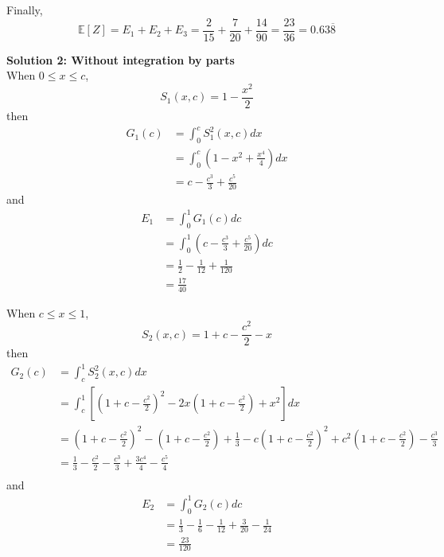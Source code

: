 \documentclass[12pt]{simple_doc}
\begin{document}
    Finally,
    \begin{equation*}
        \mathbb{E}[Z] = E_1 + E_2 + E_3 = \frac{2}{15} + \frac{7}{20} + \frac{14}{90}
                      = \frac{23}{36} = 0.63\overline{8}
    \end{equation*}


    \medskip
    \textbf{Solution 2: Without integration by parts}\\
    When $0 \leqslant x \leqslant c$,
    \begin{equation*}
        S_1(x, c) = 1 - \frac{x^2}{2}
    \end{equation*}
    then
    \begin{equation*}
		\begin{aligned}
		G_1(c) &= \int_0^c S_1^2(x, c) dx \\
		   &= \int_0^c (1 - x^2 + \frac{x^4}{4}) dx\\
           &= c - \frac{c^3}{3} + \frac{c^5}{20}
		\end{aligned}
	\end{equation*}
    and
    \begin{equation*}
		\begin{aligned}
		E_1 &= \int_0^1 G_1(c) dc \\
		   &= \int_0^1 ( c - \frac{c^3}{3} + \frac{c^5}{20}) dc\\
           &= \frac{1}{2} - \frac{1}{12} + \frac{1}{120}\\
           &= \frac{17}{40}
		\end{aligned}
	\end{equation*}

    When $c \leqslant x \leqslant 1$,
    \begin{equation*}
        S_2(x, c) = 1 + c - \frac{c^2}{2} - x
    \end{equation*}
    then
    \begin{equation*}
		\begin{aligned}
		G_2(c) &= \int_c^1 S_2^2(x, c) dx \\
		   &= \int_c^1 [(1 + c - \frac{c^2}{2})^2 - 2x(1 + c - \frac{c^2}{2}) + x^2] dx\\
           &= (1 + c - \frac{c^2}{2})^2 - (1 + c - \frac{c^2}{2}) + \frac{1}{3}
             - c(1 + c - \frac{c^2}{2})^2 + c^2(1 + c - \frac{c^2}{2}) - \frac{c^3}{3}\\
           &= \frac{1}{3} - \frac{c^2}{2} - \frac{c^3}{3} + \frac{3c^4}{4} - \frac{c^5}{4}\\
		\end{aligned}
	\end{equation*}
    and
    \begin{equation*}
		\begin{aligned}
		E_2 &= \int_0^1 G_2(c) dc \\
		   &= \frac{1}{3} - \frac{1}{6} - \frac{1}{12} + \frac{3}{20} - \frac{1}{24}\\
           &= \frac{23}{120}
		\end{aligned}
	\end{equation*}
\end{document}
